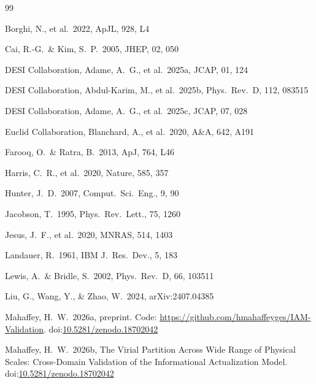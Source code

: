 \documentclass[12pt,a4paper]{article}
\begin{document}
\clearpage

\begin{thebibliography}{99}

Borghi, N., et al.\ 2022, ApJL, 928, L4

Cai, R.-G.\ \& Kim, S.\ P.\ 2005, JHEP, 02, 050

DESI Collaboration, Adame, A.\ G., et al.\ 2025a, JCAP, 01, 124

DESI Collaboration, Abdul-Karim, M., et al.\ 2025b, Phys.\ Rev.\ D, 112, 083515

DESI Collaboration, Adame, A.\ G., et al.\ 2025c, JCAP, 07, 028

Euclid Collaboration, Blanchard, A., et al.\ 2020, A\&A, 642, A191

Farooq, O.\ \& Ratra, B.\ 2013, ApJ, 764, L46

Harris, C.\ R., et al.\ 2020, Nature, 585, 357

Hunter, J.\ D.\ 2007, Comput.\ Sci.\ Eng., 9, 90

Jacobson, T.\ 1995, Phys.\ Rev.\ Lett., 75, 1260

Jesus, J.\ F., et al.\ 2020, MNRAS, 514, 1403

Landauer, R.\ 1961, IBM J.\ Res.\ Dev., 5, 183

Lewis, A.\ \& Bridle, S.\ 2002, Phys.\ Rev.\ D, 66, 103511

Liu, G., Wang, Y., \& Zhao, W.\ 2024, arXiv:2407.04385

Mahaffey, H.\ W.\ 2026a, preprint.
Code: \url{https://github.com/hmahaffeyges/IAM-Validation}.
doi:\href{https://doi.org/10.5281/zenodo.18702042}{10.5281/zenodo.18702042}

Mahaffey, H.\ W.\ 2026b, The Virial Partition Across Wide Range of Physical
Scales: Cross-Domain Validation of the Informational Actualization Model.
doi:\href{https://doi.org/10.5281/zenodo.18702042}{10.5281/zenodo.18702042}


\end{thebibliography}
\end{document}
